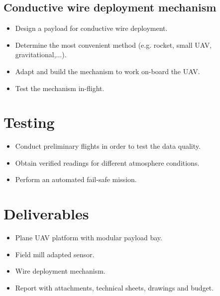 \subsection{Conductive wire deployment mechanism}
\begin{itemize}
	\item Design a payload for conductive wire deployment.
	\item Determine the most convenient method (e.g. rocket, small UAV, gravitational,...).
	\item Adapt and build the mechanism to work on-board the UAV.
	\item Test the mechanism in-flight.
\end{itemize}

\section{Testing}
\begin{itemize}
	\item Conduct preliminary flights in order to test the data quality.
	\item Obtain verified readings for different atmosphere conditions.
	\item Perform an automated fail-safe mission.
\end{itemize}
\section{Deliverables}
\begin{itemize}
	\item Plane UAV platform with modular payload bay.
	\item Field mill adapted sensor.
	\item Wire deployment mechanism.
	\item Report with attachments, technical sheets, drawings and budget.
\end{itemize}